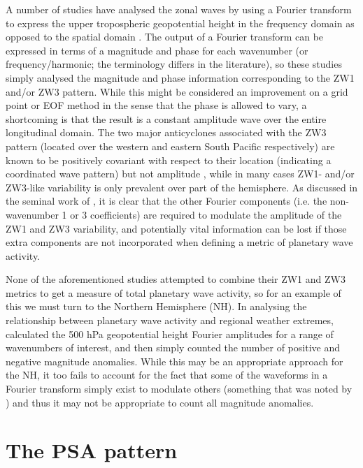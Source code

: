 A number of studies have analysed the zonal waves by using a Fourier transform to express the upper tropospheric geopotential height in the frequency domain as opposed to the spatial domain \citep{Hobbs2007,Hobbs2010,Turner2013}. The output of a Fourier transform can be expressed in terms of a magnitude and phase for each wavenumber (or frequency/harmonic; the terminology differs in the literature), so these studies simply analysed the magnitude and phase information corresponding to the ZW1 and/or ZW3 pattern. While this might be considered an improvement on a grid point or EOF method in the sense that the phase is allowed to vary, a shortcoming is that the result is a constant amplitude wave over the entire longitudinal domain. The two major anticyclones associated with the ZW3 pattern (located over the western and eastern South Pacific respectively) are known to be positively covariant with respect to their location (indicating a coordinated wave pattern) but not amplitude \citep{Hobbs2010}, while in many cases ZW1- and/or ZW3-like variability is only prevalent over part of the hemisphere. As discussed in the seminal work of \citet{vanLoon1972}, it is clear that the other Fourier components (i.e. the non-wavenumber 1 or 3 coefficients) are required to modulate the amplitude of the ZW1 and ZW3 variability, and potentially vital information can be lost if those extra components are not incorporated when defining a metric of planetary wave activity. 

None of the aforementioned studies attempted to combine their ZW1 and ZW3 metrics to get a measure of total planetary wave activity, so for an example of this we must turn to the Northern Hemisphere (NH). In analysing the relationship between planetary wave activity and regional weather extremes, \citet{Screen2014} calculated the 500 hPa geopotential height Fourier amplitudes for a range of wavenumbers of interest, and then simply counted the number of positive and negative magnitude anomalies. While this may be an appropriate approach for the NH, it too fails to account for the fact that some of the waveforms in a Fourier transform simply exist to modulate others (something that was noted by \citet{Screen2014}) and thus it may not be appropriate to count all magnitude anomalies.



\section{The PSA pattern}\label{s:psa_overview}

